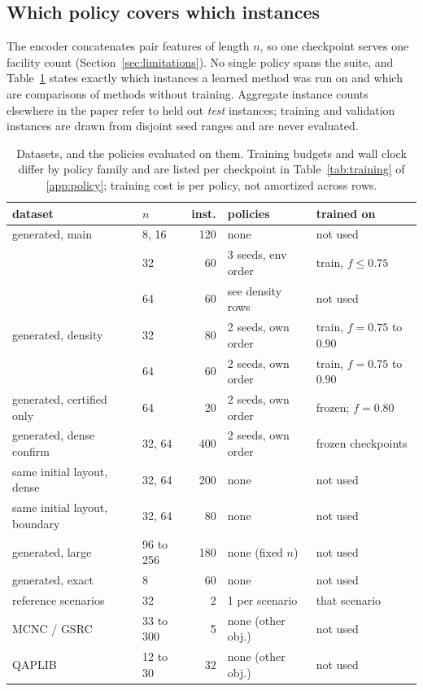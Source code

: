 \documentclass[preprint,12pt,authoryear]{elsarticle}
\begin{document}
\subsection{Which policy covers which instances}
\label{sec:coverage_map}
The encoder concatenates pair features of length $n$, so one checkpoint serves one
facility count (Section~\ref{sec:limitations}). No single policy spans the suite,
and Table~\ref{tab:datamap} states exactly which instances a learned method was
run on and which are comparisons of methods without training. Aggregate instance counts
elsewhere in the paper refer to held out \emph{test} instances; training and
validation instances are drawn from disjoint seed ranges and are never evaluated.

\begin{table}[t]
\centering
\caption{Datasets, and the policies evaluated on them. Training budgets and
wall clock differ by policy family and are listed per checkpoint in
Table~\ref{tab:training} of \ref{app:policy}; training cost is per policy, not
amortized across rows.}
\label{tab:datamap}
\footnotesize
\setlength{\tabcolsep}{3pt}
\begin{tabular}{@{}llrll@{}}
\toprule
dataset & $n$ & inst. & policies & trained on \\
\midrule
generated, main    & 8, 16   & 120 & none               & not used \\
                   & 32      &  60 & 3 seeds, env order & train, $f{\le}0.75$ \\
                   & 64      &  60 & see density rows   & not used \\
generated, density & 32      &  80 & 2 seeds, own order & train, $f{=}0.75$ to $0.90$ \\
                   & 64      &  60 & 2 seeds, own order & train, $f{=}0.75$ to $0.90$ \\
generated, certified only & 64 & 20 & 2 seeds, own order & frozen; $f{=}0.80$ \\
generated, dense confirm & 32, 64 & 400 & 2 seeds, own order & frozen checkpoints \\
same initial layout, dense & 32, 64 & 200 & none & not used \\
same initial layout, boundary & 32, 64 & 80 & none & not used \\
generated, large   & 96 to 256 & 180 & none (fixed $n$)   & not used \\
generated, exact   & 8       &  60 & none               & not used \\
reference scenarios & 32     &   2 & 1 per scenario     & that scenario \\
MCNC / GSRC        & 33 to 300 &   5 & none (other obj.)  & not used \\
QAPLIB             & 12 to 30  &  32 & none (other obj.)  & not used \\
\bottomrule
\end{tabular}
\end{table}
\end{document}
